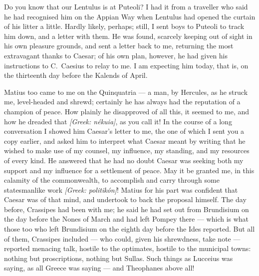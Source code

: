 

 Do you know that our Lentulus is at Puteoli? I had it from a traveller who said he had recognised him on the Appian Way when Lentulus had opened the curtain of his litter a little. Hardly likely, perhaps; still, I sent boys to Puteoli to track him down, and a letter with them. He was found, scarcely keeping out of sight in his own pleasure grounds, and sent a letter back to me, returning the most extravagant thanks to Caesar; of his own plan, however, he had given his instructions to C.\ Caesius to relay to me. I am expecting him today, that is, on the thirteenth day before the Kalends of April.

 Matius too came to me on the Quinquatria --- a man, by Hercules, as he struck me, level-headed and shrewd; certainly he has always had the reputation of a champion of peace. How plainly he disapproved of all this, it seemed to me, and how he dreaded that \textit{[Greek: n\'ekuia]}, as you call it! In the course of a long conversation I showed him Caesar's letter to me, the one of which I sent you a copy earlier, and asked him to interpret what Caesar meant by writing that he wished to make use of my counsel, my influence, my standing, and my resources of every kind. He answered that he had no doubt Caesar was seeking both my support and my influence for a settlement of peace. May it be granted me, in this calamity of the commonwealth, to accomplish and carry through some statesmanlike work \textit{[Greek: politik\'on]}! Matius for his part was confident that Caesar was of that mind, and undertook to back the proposal himself. The day before, Crassipes had been with me; he said he had set out from Brundisium on the day before the Nones of March and had left Pompey there --- which is what those too who left Brundisium on the eighth day before the Ides reported. But all of them, Crassipes included --- who could, given his shrewdness, take note --- reported menacing talk, hostile to the optimates, hostile to the municipal towns: nothing but proscriptions, nothing but Sullas. Such things as Lucceius was saying, as all Greece was saying --- and Theophanes above all!

